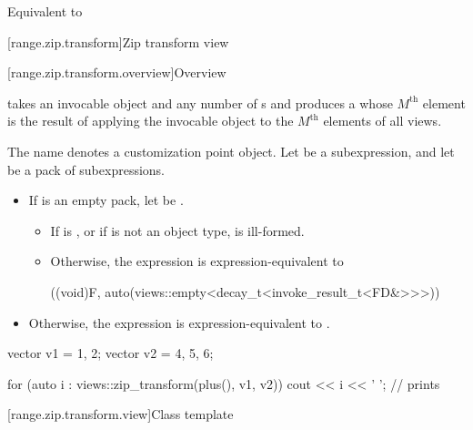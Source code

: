 \begin{itemdescr}
\pnum
\effects
Equivalent to 
\end{itemdescr}

[range.zip.transform]{Zip transform view}

[range.zip.transform.overview]{Overview}

\pnum
{}%
 takes an invocable object and
any number of s and
produces a 
whose $M^\text{th}$ element is
the result of applying the invocable object
to the $M^\text{th}$ elements of all views.

\pnum
{}%
The name  denotes
a customization point object.
Let  be a subexpression, and
let  be a pack of subexpressions.
\begin{itemize}
\item
If  is an empty pack,
let  be .
\begin{itemize}
\item
If  is , or
if  is not an object type,
 is ill-formed.
\item
Otherwise, the expression 
is expression-equivalent to
\begin{codeblock}
((void)F, auto(views::empty<decay_t<invoke_result_t<FD&>>>))
\end{codeblock}
\end{itemize}
\item
Otherwise, the expression 
is expression-equivalent to .
\end{itemize}

\pnum
\begin{example}
\begin{codeblock}
vector v1 = {1, 2};
vector v2 = {4, 5, 6};

for (auto i : views::zip_transform(plus(), v1, v2)) {
  cout << i << ' ';     // prints 
}
\end{codeblock}
\end{example}

[range.zip.transform.view]{Class template }

